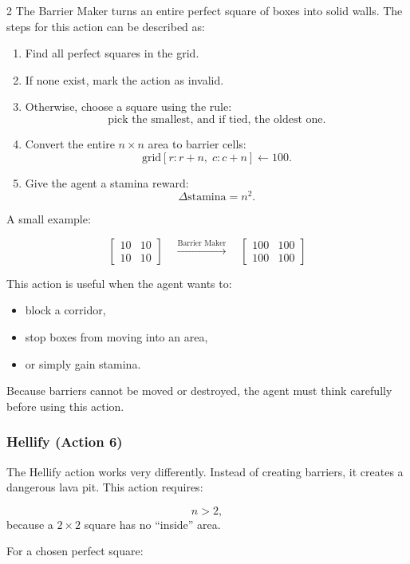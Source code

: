 \documentclass[a4paper]{article}
\begin{document}
\begin{multicols}{2}
The Barrier Maker turns an entire perfect square of boxes into solid walls. The steps for this action can be described as:

\begin{enumerate}
    \item Find all perfect squares in the grid.
    \item If none exist, mark the action as invalid.
    \item Otherwise, choose a square using the rule:
    \[
    \text{pick the smallest, and if tied, the oldest one}.
    \]
    \item Convert the entire \(n \times n\) area to barrier cells:
    \[
    \text{grid}[r : r+n,\; c : c+n] \leftarrow 100.
    \]
    \item Give the agent a stamina reward:
    \[
    \Delta \text{stamina} = n^2.
    \]
\end{enumerate}

A small example:

\[
\begin{bmatrix}
10 & 10\\
10 & 10
\end{bmatrix}
\quad \xrightarrow{\text{Barrier Maker}} \quad
\begin{bmatrix}
100 & 100\\
100 & 100
\end{bmatrix}
\]

This action is useful when the agent wants to:

\begin{itemize}
    \item block a corridor,
    \item stop boxes from moving into an area,
    \item or simply gain stamina.
\end{itemize}

Because barriers cannot be moved or destroyed, the agent must think carefully before using this action.

\subsubsection{Hellify (Action 6)}

The Hellify action works very differently. Instead of creating barriers, it creates a dangerous lava pit. This action requires:

\[
n > 2,
\]
because a \(2 \times 2\) square has no “inside” area.

For a chosen perfect square:


\end{multicols}
\end{document}
